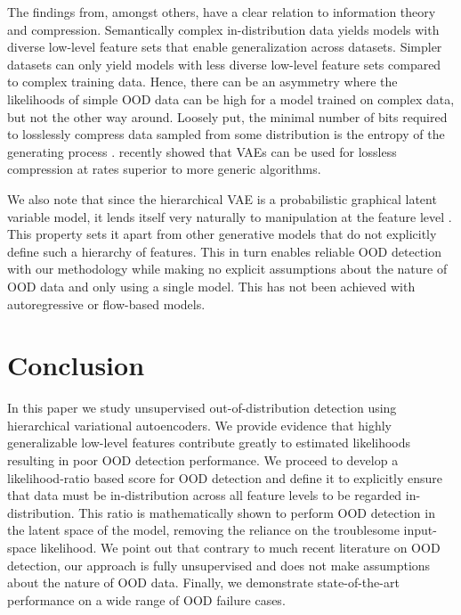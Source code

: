 {The findings from, amongst others, \textcite{nalisnick_deep_2019, serra_input_2020} have a clear relation to information theory and compression. 
Semantically complex in-distribution data yields models with diverse low-level feature sets that enable generalization across datasets.
Simpler datasets can only yield models with less diverse low-level feature sets compared to complex training data.
Hence, there can be an asymmetry where the likelihoods of simple OOD data can be high for a model trained on complex data, but not the other way around.
Loosely put, the minimal number of bits required to losslessly compress data sampled from some distribution is the entropy of the generating process \parencite{shannon_mathematical_1948, mackay_information_2003}.
\textcite{townsend_practical_2019} recently showed that VAEs can be used for lossless compression at rates superior to more generic algorithms.

We also note that since the hierarchical VAE is a probabilistic graphical latent variable model, it lends itself very naturally to manipulation at the feature level \parencite{kingma_semi-supervised_2014, maaloe_auxiliary_2016, maaloe_semisupervised_2017}.
This property sets it apart from other generative models that do not explicitly define such a hierarchy of features.
This in turn enables reliable OOD detection with our methodology while making no explicit assumptions about the nature of OOD data and only using a single model. This has not been achieved with autoregressive or flow-based models.

\section{Conclusion}
In this paper we study unsupervised out-of-distribution detection using hierarchical variational autoencoders.
We provide evidence that highly generalizable low-level features contribute greatly to estimated likelihoods resulting in poor OOD detection performance.
We proceed to develop a likelihood-ratio based score for OOD detection and define it to explicitly ensure that data must be in-distribution across all feature levels to be regarded in-distribution.
This ratio is mathematically shown to perform OOD detection in the latent space of the model, removing the reliance on the troublesome input-space likelihood.
We point out that contrary to much recent literature on OOD detection, our approach is fully unsupervised and does not make assumptions about the nature of OOD data.
Finally, we demonstrate state-of-the-art performance on a wide range of OOD failure cases.


}

